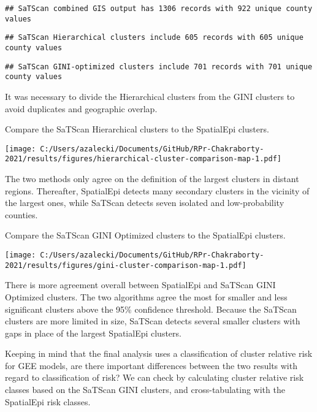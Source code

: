 \documentclass[
]{article}
\begin{document}
\begin{verbatim}
## SaTScan combined GIS output has 1306 records with 922 unique county values
\end{verbatim}

\begin{verbatim}
## SaTScan Hierarchical clusters include 605 records with 605 unique county values
\end{verbatim}

\begin{verbatim}
## SaTScan GINI-optimized clusters include 701 records with 701 unique county values
\end{verbatim}

It was necessary to divide the Hierarchical clusters from the GINI
clusters to avoid duplicates and geographic overlap.

Compare the SaTScan Hierarchical clusters to the SpatialEpi clusters.

\texttt{[image: C:/Users/azalecki/Documents/GitHub/RPr-Chakraborty-2021/results/figures/hierarchical-cluster-comparison-map-1.pdf]}

The two methods only agree on the definition of the largest clusters in
distant regions. Thereafter, SpatialEpi detects many secondary clusters
in the vicinity of the largest ones, while SaTScan detects seven
isolated and low-probability counties.

Compare the SaTScan GINI Optimized clusters to the SpatialEpi clusters.

\texttt{[image: C:/Users/azalecki/Documents/GitHub/RPr-Chakraborty-2021/results/figures/gini-cluster-comparison-map-1.pdf]}

There is more agreement overall between SpatialEpi and SaTScan GINI
Optimized clusters. The two algorithms agree the most for smaller and
less significant clusters above the 95\% confidence threshold. Because
the SaTScan clusters are more limited in size, SaTScan detects several
smaller clusters with gaps in place of the largest SpatialEpi clusters.

Keeping in mind that the final analysis uses a classification of cluster
relative risk for GEE models, are there important differences between
the two results with regard to classification of risk? We can check by
calculating cluster relative risk classes based on the SaTScan GINI
clusters, and cross-tabulating with the SpatialEpi risk classes.
\end{document}
